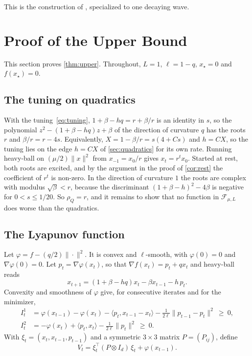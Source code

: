 \documentclass[11pt, a4paper]{article}
\theoremstyle{definition}
\newcommand{\F}{\mathcal{F}_{\mu,L}}
\begin{document}
This is the construction of \citet[§5.1 and Lemma~A.5]{pasechniuk2026two}, specialized to one decaying wave.

\section{Proof of the Upper Bound}
\label{sec:upper}

This section proves \cref{thm:upper}. Throughout, $L=1$, $\ell=1-q$, $x_\star=0$ and $f(x_\star)=0$.

\subsection{The tuning on quadratics}

With the tuning~\eqref{eq:tuning}, $1+\beta-hq=r+\beta/r$ is an identity in $s$, so the polynomial
$z^2-(1+\beta-hq)z+\beta$ of the direction of curvature $q$ has the roots $r$ and $\beta/r=r-4s$. Equivalently,
$X=1-\beta/r=s(4+Cs)$ and $h=CX$, so the tuning lies on the edge $h=CX$ of \cref{sec:quadratics} for its own rate.
Running heavy-ball on $(\mu/2)\|x\|^2$ from $x_{-1}=x_0/r$ gives $x_t=r^tx_0$. Started at rest, both roots are excited,
and by the argument in the proof of \cref{cor:rest} the coefficient of $r^t$ is non-zero. In the direction of curvature
$1$ the roots are complex with modulus $\sqrt\beta<r$, because the discriminant $(1+\beta-h)^2-4\beta$ is negative for
$0<s\le1/20$. So $\rho_Q=r$, and it remains to show that no function in $\F$ does worse than the quadratics.

\subsection{The Lyapunov function}

Let $\varphi=f-(q/2)\|\cdot\|^2$. It is convex and $\ell$-smooth, with $\varphi(0)=0$ and $\nabla\varphi(0)=0$. Let
$p_t=\nabla\varphi(x_t)$, so that $\nabla f(x_t)=p_t+qx_t$ and heavy-ball reads
\begin{equation}
  x_{t+1}=(1+\beta-hq)x_t-\beta x_{t-1}-h\,p_t.
  \label{eq:hbphi}
\end{equation}
Convexity and smoothness of $\varphi$ give, for consecutive iterates and for the minimizer,
\begin{align*}
  I^1_t&=\varphi(x_{t-1})-\varphi(x_t)-\langle p_t,x_{t-1}-x_t\rangle-\frac1{2\ell}\|p_{t-1}-p_t\|^2\ \ge\ 0,\\
  I^2_t&=-\varphi(x_t)+\langle p_t,x_t\rangle-\frac1{2\ell}\|p_t\|^2\ \ge\ 0.
\end{align*}
With $\xi_t=(x_t,x_{t-1},p_{t-1})$ and a symmetric $3\times3$ matrix $P=(P_{ij})$, define
\begin{equation}
  V_t=\xi_t^\top(P\otimes I_d)\,\xi_t+\varphi(x_{t-1}).
  \label{eq:V}
\end{equation}
\end{document}

